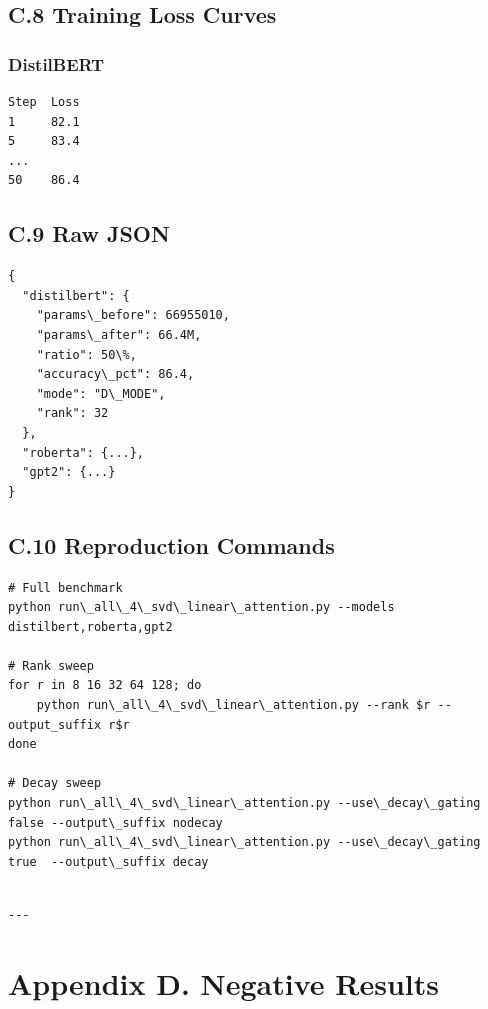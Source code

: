 \subsection{C.8 Training Loss Curves}

\subsubsection{DistilBERT}
\begin{lstlisting}
Step  Loss
1     82.1
5     83.4
...
50    86.4
\end{lstlisting}

\subsection{C.9 Raw JSON}

\begin{lstlisting}
{
  "distilbert": {
    "params\_before": 66955010,
    "params\_after": 66.4M,
    "ratio": 50\%,
    "accuracy\_pct": 86.4,
    "mode": "D\_MODE",
    "rank": 32
  },
  "roberta": {...},
  "gpt2": {...}
}
\end{lstlisting}

\subsection{C.10 Reproduction Commands}

\begin{lstlisting}
# Full benchmark
python run\_all\_4\_svd\_linear\_attention.py --models distilbert,roberta,gpt2

# Rank sweep
for r in 8 16 32 64 128; do
    python run\_all\_4\_svd\_linear\_attention.py --rank $r --output_suffix r$r
done

# Decay sweep
python run\_all\_4\_svd\_linear\_attention.py --use\_decay\_gating false --output\_suffix nodecay
python run\_all\_4\_svd\_linear\_attention.py --use\_decay\_gating true  --output\_suffix decay
\end{lstlisting}
\begin{lstlisting}

---
\end{lstlisting}


\section{Appendix D. Negative Results}


